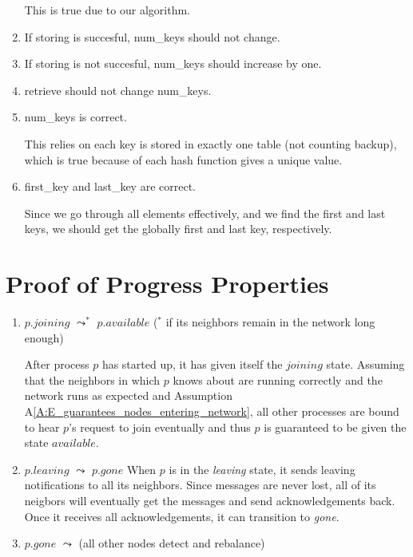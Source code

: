 \documentclass[11pt]{article}
\begin{document}
\begin{enumerate}[S1]
This is true due to our algorithm.

\item If storing is succesful, num\_keys should not change.

\item If storing is not succesful, num\_keys should increase by one.

\item retrieve should not change num\_keys.

\item num\_keys is correct.

This relies on each key is stored in exactly one table (not counting backup), which is true because of each hash function gives a unique value.


\item first\_key and last\_key are correct.

Since we go through all elements effectively, and we find the first and last keys, we should get the globally first and last key, respectively.
\end{enumerate}



\section{Proof of Progress Properties}
\begin{enumerate}[PG1]
\item
$p.joining$ $\leadsto^*$ $p.available$ ($^*$ if its neighbors remain in the network long enough) 

\indent After process $p$ has started up, it has given itself the $joining$ state. Assuming that the neighbors in which $p$ knows about are running correctly and the network runs as expected and Assumption A\ref{A:E_guarantees_nodes_entering_network}, all other processes are bound to hear $p$'s request to join eventually and thus $p$ is guaranteed to be given the state $available$.

\item 
$p.leaving$ $\leadsto$ $p.gone$
When $p$ is in the \emph{leaving} state, it sends leaving notifications to all its neighbors. Since messages are never lost, all of its neigbors will eventually get the messages and send acknowledgements back. Once it receives all acknowledgements, it can transition to \emph{gone}.

\item 
$p.gone$ $\leadsto$ (all other nodes detect and rebalance)

\end{enumerate}

\end{document}
